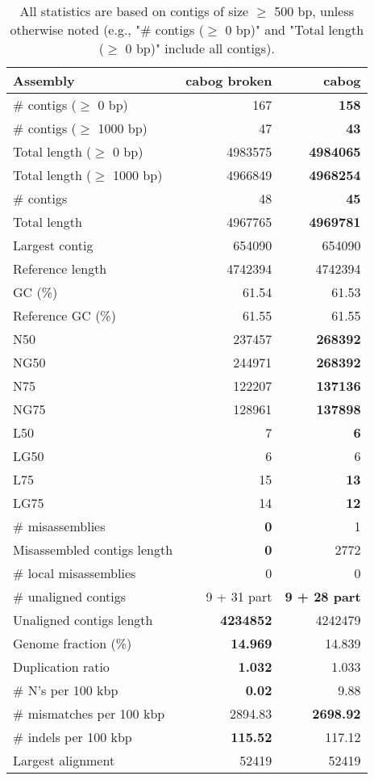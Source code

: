 \documentclass[12pt,a4paper]{article}
\begin{document}
\begin{table}[ht]
\begin{center}
\caption{All statistics are based on contigs of size $\geq$ 500 bp, unless otherwise noted (e.g., "\# contigs ($\geq$ 0 bp)" and "Total length ($\geq$ 0 bp)" include all contigs).}
\begin{tabular}{|l*{2}{|r}|}
\hline
Assembly & cabog broken & cabog \\ \hline
\# contigs ($\geq$ 0 bp) & 167 & {\bf 158} \\ \hline
\# contigs ($\geq$ 1000 bp) & 47 & {\bf 43} \\ \hline
Total length ($\geq$ 0 bp) & 4983575 & {\bf 4984065} \\ \hline
Total length ($\geq$ 1000 bp) & 4966849 & {\bf 4968254} \\ \hline
\# contigs & 48 & {\bf 45} \\ \hline
Total length & 4967765 & {\bf 4969781} \\ \hline
Largest contig & 654090 & 654090 \\ \hline
Reference length & 4742394 & 4742394 \\ \hline
GC (\%) & 61.54 & 61.53 \\ \hline
Reference GC (\%) & 61.55 & 61.55 \\ \hline
N50 & 237457 & {\bf 268392} \\ \hline
NG50 & 244971 & {\bf 268392} \\ \hline
N75 & 122207 & {\bf 137136} \\ \hline
NG75 & 128961 & {\bf 137898} \\ \hline
L50 & 7 & {\bf 6} \\ \hline
LG50 & 6 & 6 \\ \hline
L75 & 15 & {\bf 13} \\ \hline
LG75 & 14 & {\bf 12} \\ \hline
\# misassemblies & {\bf 0} & 1 \\ \hline
Misassembled contigs length & {\bf 0} & 2772 \\ \hline
\# local misassemblies & 0 & 0 \\ \hline
\# unaligned contigs & 9 + 31 part & {\bf 9 + 28 part} \\ \hline
Unaligned contigs length & {\bf 4234852} & 4242479 \\ \hline
Genome fraction (\%) & {\bf 14.969} & 14.839 \\ \hline
Duplication ratio & {\bf 1.032} & 1.033 \\ \hline
\# N's per 100 kbp & {\bf 0.02} & 9.88 \\ \hline
\# mismatches per 100 kbp & 2894.83 & {\bf 2698.92} \\ \hline
\# indels per 100 kbp & {\bf 115.52} & 117.12 \\ \hline
Largest alignment & 52419 & 52419 \\ \hline
\end{tabular}
\end{center}
\end{table}
\end{document}
